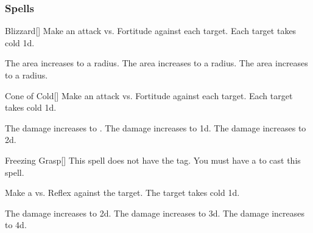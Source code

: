 \subsubsection{Spells}


\lowercase{\hypertarget{spell:Blizzard}{}}\label{spell:Blizzard}
\begin{freeability}[Rank 1]{\hypertarget{spell:Blizzard}{Blizzard}}[]
Make an attack vs. Fortitude against each target.
\hit Each target takes cold  \minus1d.

\rankline
{} The area increases to a \areamed radius.
 The area increases to a \arealarge radius.
 The area increases to a \areahuge radius.
\end{freeability}
\vspace{0.25em}



\lowercase{\hypertarget{spell:Cone of Cold}{}}\label{spell:Cone of Cold}
\begin{freeability}[Rank 1]{\hypertarget{spell:Cone of Cold}{Cone of Cold}}[]
Make an attack vs. Fortitude against each target.
\hit Each target takes cold  \minus1d.

\rankline
{} The damage increases to .
 The damage increases to  \plus1d.
 The damage increases to  \plus2d.
\end{freeability}
\vspace{0.25em}



\lowercase{\hypertarget{spell:Freezing Grasp}{}}\label{spell:Freezing Grasp}
\begin{freeability}[Rank 1]{\hypertarget{spell:Freezing Grasp}{Freezing Grasp}}[]
This spell does not have the  tag.
You must have a  to cast this spell.

Make a  vs. Reflex against the target.
\hit The target takes cold  \plus1d.

\rankline
{} The damage increases to  \plus2d.
 The damage increases to  \plus3d.
 The damage increases to  \plus4d.
\end{freeability}
\vspace{0.25em}



